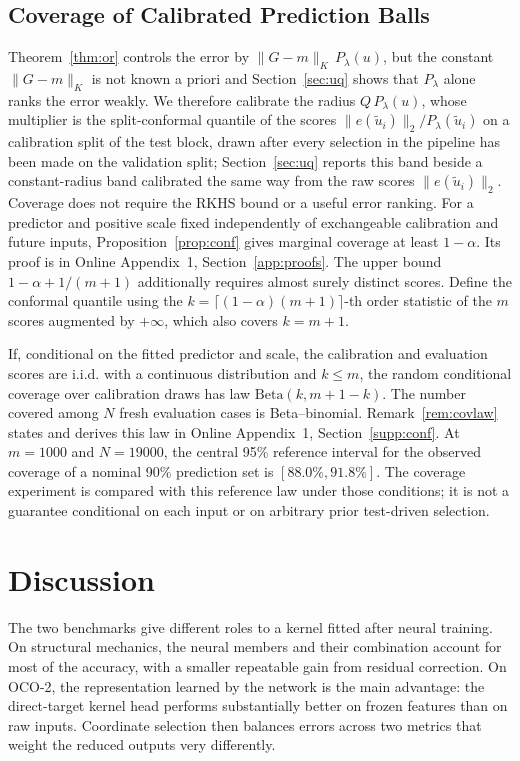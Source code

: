 \documentclass[twoside,11pt]{article}
\begin{document}
\subsection{Coverage of Calibrated Prediction Balls}
\label{sec:theory-conf}
Theorem~\ref{thm:or} controls the error by $\|G-m\|_K\,P_\lambda(u)$, but
the constant $\|G-m\|_K$ is not known a priori and
Section~\ref{sec:uq} shows that $P_\lambda$ alone ranks the error weakly.
We therefore calibrate the radius
$Q\,P_\lambda(u)$, whose multiplier is the split-conformal quantile of the
scores $\|e(\tilde u_i)\|_2/P_\lambda(\tilde u_i)$ on a calibration split of
the test block, drawn after every selection in the pipeline has been made
on the validation split; Section~\ref{sec:uq} reports this band beside a
constant-radius band calibrated the same way from the raw scores
$\|e(\tilde u_i)\|_2$. Coverage does not require the RKHS bound or a useful error ranking. For a predictor and positive scale fixed independently of exchangeable calibration and future inputs, Proposition~\ref{prop:conf} gives marginal coverage at least $1-\alpha$. Its proof is in Online Appendix~1, Section~\ref{app:proofs}. The upper bound $1-\alpha+1/(m+1)$ additionally requires almost surely distinct scores. Define the conformal quantile using the $k=\lceil(1-\alpha)(m+1)\rceil$-th order statistic of the $m$ scores augmented by $+\infty$, which also covers $k=m+1$.

If, conditional on the fitted predictor and scale, the calibration and evaluation scores are i.i.d. with a continuous distribution and $k\le m$, the random conditional coverage over calibration draws has law $\mathrm{Beta}(k,m+1-k)$. The number covered among $N$ fresh evaluation cases is Beta--binomial. Remark~\ref{rem:covlaw} states and derives this law in Online Appendix~1, Section~\ref{supp:conf}. At $m=1000$ and $N=19000$, the central 95\% reference interval for the observed coverage of a nominal 90\% prediction set is $[88.0\%,91.8\%]$. The coverage experiment is compared with this reference law under those conditions; it is not a guarantee conditional on each input or on arbitrary prior test-driven selection.


\section{Discussion}
\label{sec:discussion}
The two benchmarks give different roles to a kernel fitted after neural training. On structural mechanics, the neural members and their combination account for most of the accuracy, with a smaller repeatable gain from residual correction. On OCO-2, the representation learned by the network is the main advantage: the direct-target kernel head performs substantially better on frozen features than on raw inputs. Coordinate selection then balances errors across two metrics that weight the reduced outputs very differently.
\end{document}
